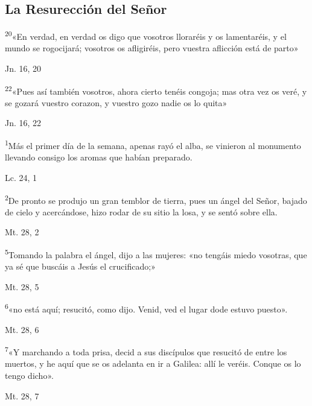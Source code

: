 \documentclass[a4paper,11pt]{article}
\begin{document}
    \subsection*{\hfil La Resurección del Señor \hfil}
      \textsuperscript{20}«En verdad, en verdad os digo que vosotros lloraréis y os lamentaréis, y el mundo se rogocijará;
      vosotros os afligiréis, pero vuestra aflicción está de parto»
      \begin{flushright}
        Jn. 16, 20        
      \end{flushright}      
      \textsuperscript{22}«Pues así también vosotros, ahora cierto tenéis congoja; mas otra vez os veré, y se gozará vuestro corazon,
      y vuestro gozo nadie os lo quita»
      \begin{flushright}
        Jn. 16, 22       
      \end{flushright}      
      \textsuperscript{1}Más el primer día de la semana, apenas rayó el alba, se vinieron al monumento llevando consigo los aromas
      que habían preparado.
      \begin{flushright}
        Lc. 24, 1        
      \end{flushright}      
      \textsuperscript{2}De pronto se produjo un gran temblor de tierra, pues un ángel del Señor, bajado de cielo y acercándose, hizo rodar
      de su sitio la losa, y se sentó sobre ella.
      \begin{flushright}
        Mt. 28, 2        
      \end{flushright}      
      \textsuperscript{5}Tomando la palabra el ángel, dijo a las mujeres: «no tengáis miedo vosotras, que ya sé que buscáis a Jesús el crucificado;»
      \begin{flushright}
        Mt. 28, 5        
      \end{flushright}      
      \textsuperscript{6}«no está aquí; resucitó, como dijo. Venid, ved el lugar dode estuvo puesto».
      \begin{flushright}
        Mt. 28, 6       
      \end{flushright}      
      \textsuperscript{7}«Y marchando a toda prisa, decid a sus discípulos que resucitó de entre los muertos, y he aquí que se os adelanta en ir a Galilea:
      allí le veréis. Conque os lo tengo dicho».
      \begin{flushright}
        Mt. 28, 7     
      \end{flushright}      
\end{document}
